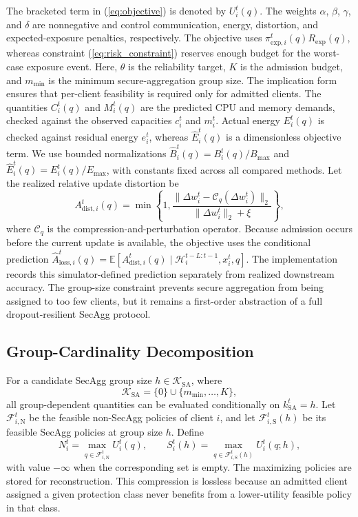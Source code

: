 \documentclass[preprint,12pt]{elsarticle}
\begin{document}
The bracketed term in (\ref{eq:objective}) is denoted by $U_i^t(q)$. The weights $\alpha$, $\beta$, $\gamma$, and $\delta$ are nonnegative and control communication, energy, distortion, and expected-exposure penalties, respectively. The objective uses $\pi_{\mathrm{exp},i}^t(q)R_{\mathrm{exp}}(q)$, whereas constraint (\ref{eq:risk_constraint}) reserves enough budget for the worst-case exposure event. Here, $\theta$ is the reliability target, $K$ is the admission budget, and $m_{\min}$ is the minimum secure-aggregation group size. The implication form ensures that per-client feasibility is required only for admitted clients. The quantities $C_i^t(q)$ and $M_i^t(q)$ are the predicted CPU and memory demands, checked against the observed capacities $c_i^t$ and $m_i^t$. Actual energy $E_i^t(q)$ is checked against residual energy $e_i^t$, whereas $\hat E_i^t(q)$ is a dimensionless objective term. We use bounded normalizations $\hat B_i^t(q)=B_i^t(q)/B_{\max}$ and $\hat E_i^t(q)=E_i^t(q)/E_{\max}$, with constants fixed across all compared methods. Let the realized relative update distortion be
\begin{equation}
	A_{\mathrm{dist},i}^t(q)=
	\min\!\left\{1,
	\frac{\|\Delta w_i^t-\mathcal{C}_q(\Delta w_i^t)\|_2}
	{\|\Delta w_i^t\|_2+\xi}\right\},
	\label{eq:update_distortion}
\end{equation}
where $\mathcal C_q$ is the compression-and-perturbation operator. Because admission occurs before the current update is available, the objective uses the conditional prediction $\hat A_{\mathrm{loss},i}^t(q)=\mathbb E[A_{\mathrm{dist},i}^t(q)\mid\mathcal H_i^{t-L:t-1},x_i^t,q]$. The implementation records this simulator-defined prediction separately from realized downstream accuracy. The group-size constraint prevents secure aggregation from being assigned to too few clients, but it remains a first-order abstraction of a full dropout-resilient SecAgg protocol.

\subsection{Group-Cardinality Decomposition}

For a candidate SecAgg group size \(h\in\mathcal K_{\mathrm{SA}}\), where
\begin{equation}
	\mathcal K_{\mathrm{SA}}=\{0\}\cup\{m_{\min},\ldots,K\},
\end{equation}
all group-dependent quantities can be evaluated conditionally on \(k_{\mathrm{SA}}^t=h\). Let \(\mathcal F_{i,\mathrm N}^t\) be the feasible non-SecAgg policies of client \(i\), and let \(\mathcal F_{i,\mathrm S}^t(h)\) be its feasible SecAgg policies at group size \(h\). Define
\begin{equation}
	N_i^t=\max_{q\in\mathcal F_{i,\mathrm N}^t}U_i^t(q),
	\qquad
	S_i^t(h)=\max_{q\in\mathcal F_{i,\mathrm S}^t(h)}U_i^t(q;h),
	\label{eq:compressed_actions}
\end{equation}
with value \(-\infty\) when the corresponding set is empty. The maximizing policies are stored for reconstruction. This compression is lossless because an admitted client assigned a given protection class never benefits from a lower-utility feasible policy in that class.
\end{document}
